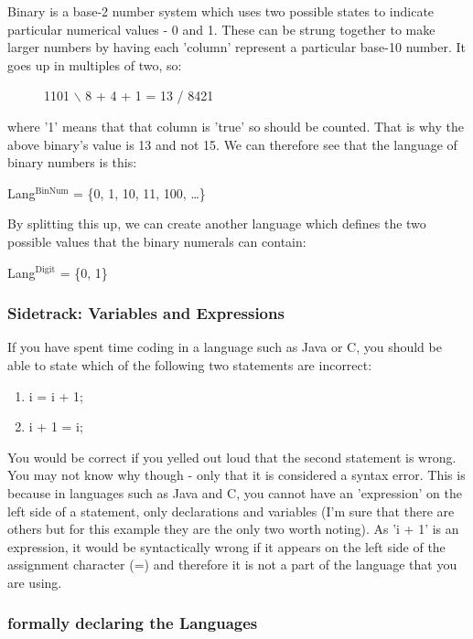 \documentclass[12pt]{article}
\begin{document}
Binary is a base-2 number system which uses two possible states to indicate
particular numerical values - 0 and 1.  These can be strung together to make
larger numbers by having each 'column' represent a particular base-10 number.
It goes up in multiples of two, so:


\begin{figure}

1101
    $\backslash$
     8 + 4 + 1 = 13
    /
8421
\end{figure}

where '1' means that that column is 'true' so should be counted.  That is why
the above binary's value is 13 and not 15.  We can therefore see  that the
language of binary numbers is this:

Lang$^{\text{BinNum}}$ = \{0, 1, 10, 11, 100, \ldots{}\}

By splitting this up, we can create another language which defines the two
possible values that the binary numerals can contain:

Lang$^{\text{Digit}}$ = \{0, 1\}

\subsubsection{Sidetrack: Variables and Expressions}
\label{sec-2-3-2}
If you have spent time coding in a language such as Java or C, you should be
able to state which of the following two statements are incorrect:

\begin{enumerate}
\item i = i + 1;
\item i + 1 = i;
\end{enumerate}

You would be correct if you yelled out loud that the second statement is wrong.
You may not know why though - only that it is considered a syntax error.  This
is because in languages such as Java and C, you cannot have an 'expression' on
the left side of a statement, only declarations and variables (I'm sure that
there are others but for this example they are the only two worth noting).  As
'i + 1' is an expression, it would be syntactically wrong if it appears on the
left side of the assignment character (=) and therefore it is not a part of the
language that you are using.

\subsubsection{formally declaring the Languages}
\label{sec-2-3-3}
\end{document}
